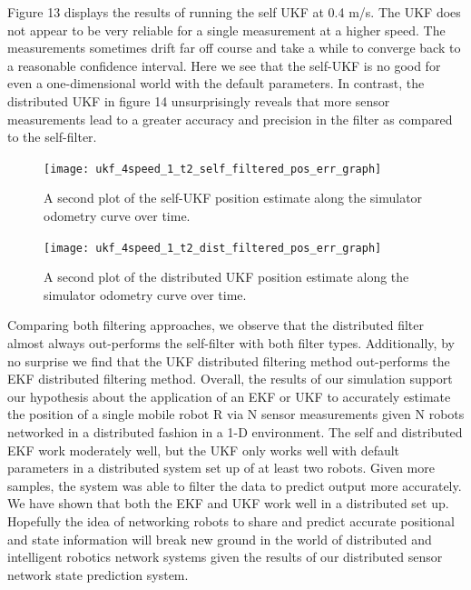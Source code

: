 \documentclass[conference]{IEEEtran} \usepackage[T1]{fontenc} \usepackage[backend=biber, style=ieee]{biblatex}
\begin{document}
Figure 13 displays the results of running the self UKF at 0.4 m/s. The UKF does not 
appear to be very reliable for a single measurement at a higher speed. The measurements 
sometimes drift far off course and take a while to converge back to a reasonable 
confidence interval. Here we see that the self-UKF is no good for even a one-dimensional world with the default parameters.
In contrast, the distributed UKF in figure 14 unsurprisingly reveals that more sensor measurements lead to a greater
accuracy and precision in the filter as compared to the self-filter. 

\begin{figure}
\centering 
\texttt{[image: ukf\_4speed\_1\_t2\_self\_filtered\_pos\_err\_graph]}
\caption {A second plot of the self-UKF position estimate along the simulator 
odometry curve over time.}
\label{pic13} 
\end{figure}

\begin{figure}
\centering 
\texttt{[image: ukf\_4speed\_1\_t2\_dist\_filtered\_pos\_err\_graph]}
\caption {A second plot of the distributed UKF position estimate along the simulator odometry curve over time.}
\label{pic14} 
\end{figure}

Comparing both filtering approaches, we observe that the distributed filter almost always out-performs the self-filter 
with both filter types. Additionally, by no surprise we find that the UKF distributed filtering method out-performs the EKF distributed
filtering method. Overall, the results of our simulation support our hypothesis about the application of an EKF or UKF to accurately
estimate the position of a single mobile robot R via N sensor measurements given N robots networked in a distributed fashion in a 1-D environment. 
The self and distributed EKF work moderately well, but the UKF only works well with default parameters in a distributed system set up of at least 
two robots. Given more samples, the system was able to filter the data to predict output more accurately. We have shown that both the EKF 
and UKF work well in a distributed set up. Hopefully the idea of networking robots to share and predict accurate positional and state information will break new ground in the world of distributed and intelligent robotics network systems given the results of our distributed sensor network state prediction
system.
\end{document}

